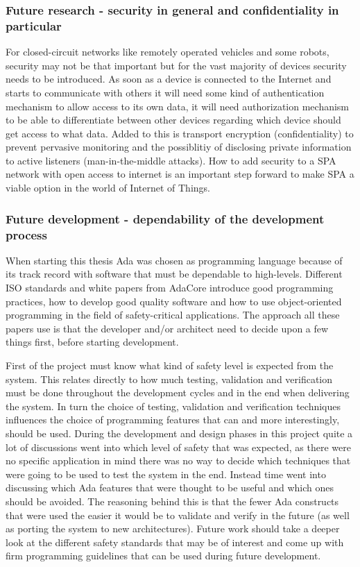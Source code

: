 \subsubsection{Future research - security in general and confidentiality in
particular}
For closed-circuit networks like remotely operated vehicles and some robots,
security may not be that important but for the vast majority of devices
security needs to be introduced. As soon as a device is connected to the
Internet and starts to communicate with others it will need some kind of
authentication mechanism to allow access to its own data, it will need
authorization mechanism to be able to differentiate between other devices
regarding which device should get access to what data. Added to this is
transport encryption (confidentiality) to prevent pervasive monitoring and the
possiblitiy of disclosing private information to active listeners
(man-in-the-middle attacks).  How to add security to a SPA network with open
access to internet is an important step forward to make SPA a viable option in
the world of Internet of Things.

\subsubsection{Future development - dependability of the development process}
When starting this thesis Ada was chosen as programming language because of its
track record with software that must be dependable to high-levels. Different
ISO standards and white papers from AdaCore introduce good programming
practices, how to develop good quality software and how to use object-oriented
programming in the field of safety-critical applications. The approach all
these papers use is that the developer and/or architect need to decide upon a
few things first, before starting development.

First of the project must know what kind of safety level is expected from the
system. This relates directly to how much testing, validation and verification
must be done throughout the development cycles and in the end when delivering
the system. In turn the choice of testing, validation and verification
techniques influences the choice of programming features that can and more
interestingly, should be used. During the development and design phases in this
project quite a lot of discussions went into which level of safety that was
expected, as there were no specific application in mind there was no way to
decide which techniques that were going to be used to test the system in the
end.  Instead time went into discussing which Ada features that were thought to
be useful and which ones should be avoided. The reasoning behind this is that
the fewer Ada constructs that were used the easier it would be to validate and
verify in the future (as well as porting the system to new architectures).
Future work should take a deeper look at the different safety standards that
may be of interest and come up with firm programming guidelines that can be
used during future development.

